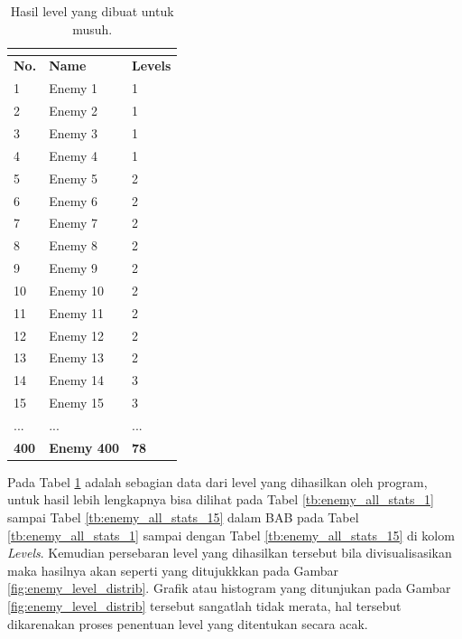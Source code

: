 \begin{longtable}{|l|l|l|}
	\caption{Hasil level yang dibuat untuk musuh.}
	\vspace{1ex}
	\label{tb:enemy_level_distrib}\\
	\hline
	\rowcolor[HTML]{C0C0C0} 
	\textbf{No.} & \textbf{Name} & \textbf{Levels} \\ \hline
	1 & Enemy 1 & 1 \\ \hline
	2 & Enemy 2 & 1 \\ \hline
	3 & Enemy 3 & 1 \\ \hline
	4 & Enemy 4 & 1 \\ \hline
	5 & Enemy 5 & 2 \\ \hline
	6 & Enemy 6 & 2 \\ \hline
	7 & Enemy 7 & 2 \\ \hline
	8 & Enemy 8 & 2 \\ \hline
	9 & Enemy 9 & 2 \\ \hline
	10 & Enemy 10 & 2 \\ \hline
	11 & Enemy 11 & 2 \\ \hline
	12 & Enemy 12 & 2 \\ \hline
	13 & Enemy 13 & 2 \\ \hline
	14 & Enemy 14 & 3 \\ \hline
	15 & Enemy 15 & 3 \\ \hline
	... & ... & ... \\ \hline
	\textbf{400} & \textbf{Enemy 400} & \textbf{78} \\ \hline
\end{longtable}
\vspace{1ex}

Pada Tabel \ref{tb:enemy_level_distrib} adalah sebagian data dari level yang dihasilkan oleh program, untuk hasil lebih lengkapnya bisa dilihat pada Tabel \ref{tb:enemy_all_stats_1} sampai Tabel \ref{tb:enemy_all_stats_15} dalam BAB  pada Tabel \ref{tb:enemy_all_stats_1} sampai dengan Tabel \ref{tb:enemy_all_stats_15} di kolom \textit{Levels}. Kemudian persebaran level yang dihasilkan tersebut bila divisualisasikan maka hasilnya akan seperti yang ditujukkkan pada Gambar \ref{fig:enemy_level_distrib}. Grafik atau histogram yang ditunjukan pada Gambar \ref{fig:enemy_level_distrib} tersebut sangatlah tidak merata, hal tersebut dikarenakan proses penentuan level yang ditentukan secara acak.

